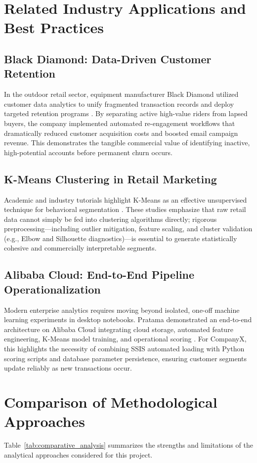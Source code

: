 \section{Related Industry Applications and Best Practices}
\subsection{Black Diamond: Data-Driven Customer Retention}
In the outdoor retail sector, equipment manufacturer Black Diamond utilized customer data analytics to unify fragmented transaction records and deploy targeted retention programs \parencite{lexer2019blackdiamond}. By separating active high-value riders from lapsed buyers, the company implemented automated re-engagement workflows that dramatically reduced customer acquisition costs and boosted email campaign revenue. This demonstrates the tangible commercial value of identifying inactive, high-potential accounts before permanent churn occurs.

\subsection{K-Means Clustering in Retail Marketing}
Academic and industry tutorials highlight K-Means as an effective unsupervised technique for behavioral segmentation \parencite{towardsai2022kmeans}. These studies emphasize that raw retail data cannot simply be fed into clustering algorithms directly; rigorous preprocessing---including outlier mitigation, feature scaling, and cluster validation (e.g., Elbow and Silhouette diagnostics)---is essential to generate statistically cohesive and commercially interpretable segments.

\subsection{Alibaba Cloud: End-to-End Pipeline Operationalization}
Modern enterprise analytics requires moving beyond isolated, one-off machine learning experiments in desktop notebooks. Pratama demonstrated an end-to-end architecture on Alibaba Cloud integrating cloud storage, automated feature engineering, K-Means model training, and operational scoring \parencite{pratama2020segmentation}. For CompanyX, this highlights the necessity of combining SSIS automated loading with Python scoring scripts and database parameter persistence, ensuring customer segments update reliably as new transactions occur.

\section{Comparison of Methodological Approaches}
Table~\ref{tab:comparative_analysis} summarizes the strengths and limitations of the analytical approaches considered for this project.

